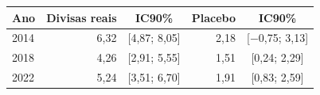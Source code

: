 \begin{tabular}{lrcrc}
\toprule
Ano & Divisas reais & IC90\% & Placebo & IC90\% \\
\midrule
2014 & 6{,}32 & [4{,}87; 8{,}05] & 2{,}18 & [$-$0{,}75; 3{,}13] \\
2018 & 4{,}26 & [2{,}91; 5{,}55] & 1{,}51 & [0{,}24; 2{,}29] \\
2022 & 5{,}24 & [3{,}51; 6{,}70] & 1{,}91 & [0{,}83; 2{,}59] \\
\bottomrule
\end{tabular}
